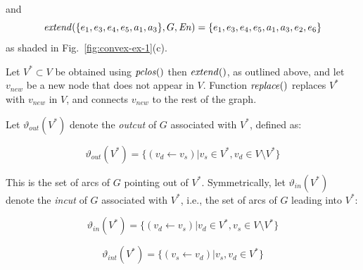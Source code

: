 
%
 and 
\[
 \mathit{extend}(\{e_1, e_3, e_4, e_5, a_1, a_3\}, G, \mathit{En}) = \{e_1, e_3, e_4, e_5, a_1, a_3, e_2, e_6\}
\]
 as shaded in Fig.~\ref{fig:convex-ex-1}(c). 

  

Let $V^* \subset V$ be obtained using $\mathit{pclos}()$ then $\mathit{extend}()$, as outlined above, and let $v_{new}$ be a new node that does not appear in $V$.
%
Function $\mathit{replace}()$ replaces $V^*$ with $v_{new}$ in $V$, and connects $v_{new}$ to the rest of the graph. 



Let $\vartheta_{out}(V^*)$ denote the \textit{outcut} of $G$ associated with $V^*$, defined as:

\begin{equation}
 \vartheta_{out}(V^*) = \{  (v_d \leftarrow v_s) |   v_s \in  V^*, v_d \in V \setminus V^*\}
\end{equation}
 
This is the set of arcs of $G$ pointing out of $V^*$.
%
Symmetrically, let $\vartheta_{in}(V^*)$ denote the \textit{incut}  of $G$ associated with $V^*$, i.e., the set of arcs of $G$ leading into $V^*$:

\begin{equation} \vartheta_{in}(V^*) = \{  (v_d\leftarrow v_s) |  v_d \in V^*, v_s \in  V \setminus V^* \}
\end{equation}

%
\begin{equation}
\vartheta_{int}(V^*) = \{  (v_s\leftarrow v_d) | v_s, v_d \in V^*\}
\end{equation}

